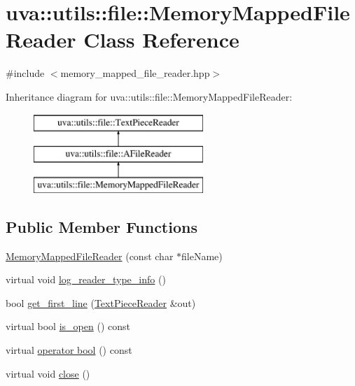 \hypertarget{classuva_1_1utils_1_1file_1_1_memory_mapped_file_reader}{}\section{uva\+:\+:utils\+:\+:file\+:\+:Memory\+Mapped\+File\+Reader Class Reference}
\label{classuva_1_1utils_1_1file_1_1_memory_mapped_file_reader}


{\ttfamily \#include $<$memory\+\_\+mapped\+\_\+file\+\_\+reader.\+hpp$>$}

Inheritance diagram for uva\+:\+:utils\+:\+:file\+:\+:Memory\+Mapped\+File\+Reader\+:\begin{figure}[H]
\begin{center}
\leavevmode
\includegraphics[height=3.000000cm]{classuva_1_1utils_1_1file_1_1_memory_mapped_file_reader}
\end{center}
\end{figure}
\subsection*{Public Member Functions}
\begin{DoxyCompactItemize}
\item 
\hyperlink{classuva_1_1utils_1_1file_1_1_memory_mapped_file_reader_aae67e1d620fc395eb39a5958168e32c4}{Memory\+Mapped\+File\+Reader} (const char $\ast$file\+Name)
\item 
virtual void \hyperlink{classuva_1_1utils_1_1file_1_1_memory_mapped_file_reader_ae7a14d14ccf1e7675b8cd61dd5f484de}{log\+\_\+reader\+\_\+type\+\_\+info} ()
\item 
bool \hyperlink{classuva_1_1utils_1_1file_1_1_memory_mapped_file_reader_a0c282b25e7aaf9eb590101bbee87cdb2}{get\+\_\+first\+\_\+line} (\hyperlink{classuva_1_1utils_1_1file_1_1_text_piece_reader}{Text\+Piece\+Reader} \&out)
\item 
virtual bool \hyperlink{classuva_1_1utils_1_1file_1_1_memory_mapped_file_reader_ab8dc396aa971ca5bc9f4bfd12d3cba53}{is\+\_\+open} () const 
\item 
virtual \hyperlink{classuva_1_1utils_1_1file_1_1_memory_mapped_file_reader_a159f83efd1ab7b2d441f9c2056a77d03}{operator bool} () const 
\item 
virtual void \hyperlink{classuva_1_1utils_1_1file_1_1_memory_mapped_file_reader_a68ab6e35c2b6ceb641c698a045d1a211}{close} ()
\end{DoxyCompactItemize}
